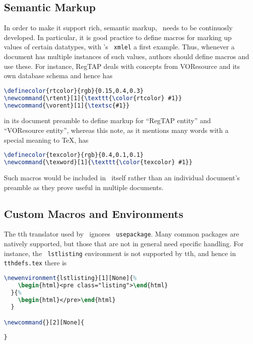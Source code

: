 \documentclass[11pt,a4paper]{ivoa}
\newcommand{\texword}[1]{\texttt{\color{texcolor} #1}}
\begin{document}
\subsection{Semantic Markup}

In order to make it support rich, semantic markup, \ivoatex\ needs to be
continuosly developed.  In particular, it is good practice to define
macros for marking up values of certain datatypes, with \ivoatex's
\texword{xmlel} a first example.  Thus, whenever a document has multiple
instances of such values, authors should define macros and use these.
For instance, RegTAP deals with concepts from VOResource and its own
database schema and hence has

\begin{lstlisting}[language=TeX]
\definecolor{rtcolor}{rgb}{0.15,0.4,0.3}
\newcommand{\rtent}[1]{\texttt{\color{rtcolor} #1}}
\newcommand{\vorent}[1]{\textsc{#1}}
\end{lstlisting}

in its document preamble to
define markup for ``RegTAP entity'' and ``VOResource entity'', whereas
this note, as it mentions many words with a special meaning to \TeX, has

\begin{lstlisting}[language=TeX]
\definecolor{texcolor}{rgb}{0.4,0.1,0.1}
\newcommand{\texword}[1]{\texttt{\color{texcolor} #1}}
\end{lstlisting}

Such macros would be included in \ivoatex\ itself rather than an
individual document's preamble as they prove useful in multiple
documents.

\subsection{Custom Macros and Environments}

The tth translator used by \ivoatex\ ignores \texword{usepackage}.  Many
common packages are natively supported, but those that are not in
general need specific handling.  For instance, the \texword{lstlisting}
environment is not supported by tth, and hence in
\texttt{tthdefs.tex} there is

\begin{lstlisting}[language=TeX]
\newenvironment{lstlisting}[1][None]{%
    \begin{html}<pre class="listing">\end{html}
  }{%
    \begin{html}</pre>\end{html}
  }

\newcommand{}[2][None]{
  
}
\end{lstlisting}
\end{document}
